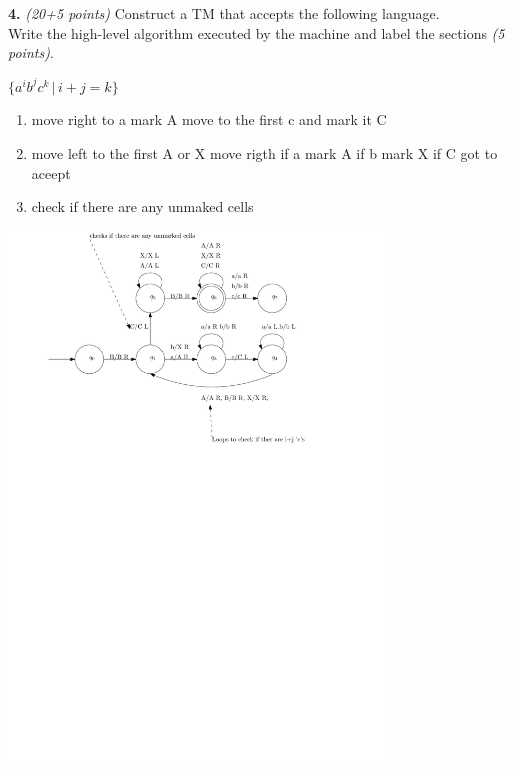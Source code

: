 \documentclass[12pt]{article}
\begin{document}
\vspace{0.2in}

{\bf 4.} {\em (20+5 points)}
Construct a TM that accepts the following language.\\
Write the high-level algorithm executed by the machine and label the
sections {\em (5 points)}.

$\{ a^i b^j c^k  \,|\, i + j = k\}$


\begin{enumerate}
\item move right to a mark A move to the first c and mark it C
\item move left to the first A or X  move rigth if a mark A if b mark X if C got to aceept
\item check if there are any unmaked cells
\end{enumerate}

\begin{center}
\includegraphics[width=0.75\textwidth]{TM2.pdf}
\end{center}
\end{document}
